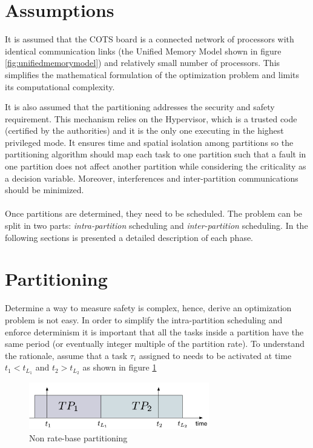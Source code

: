 \section{Assumptions}
It is assumed that the COTS board is a connected network of processors with identical communication links (the Unified Memory Model shown in figure \ref{fig:unifiedmemorymodel}) and relatively small number of processors. This simplifies the mathematical formulation of the optimization problem and limits its computational complexity.
\par It is also assumed that the partitioning addresses the security and safety requirement. This mechanism relies on the Hypervisor, which is a trusted code (certified by the authorities) and it is the only one executing in the highest privileged mode. It ensures time and spatial isolation among partitions so the partitioning algorithm should map each task to one partition such that a fault in one partition does not affect another partition while considering the criticality as a decision variable. Moreover, interferences and  inter-partition communications should be minimized.

\paragraph{} Once partitions are determined, they need to be scheduled. The problem can be split in two parts: \emph{intra-partition} scheduling and \emph{inter-partition} scheduling. In the following sections is presented a detailed description of each phase.

\section{Partitioning}
Determine a way to measure safety is complex, hence, derive an optimization problem is not easy. In order to simplify the intra-partition scheduling and enforce determinism it is important that all the tasks inside a partition have the same period (or eventually integer multiple of the partition rate). To understand the rationale, assume that a task $\tau_i$ assigned to  needs to be activated at time $t_1<t_{L_1}$ and $t_2>t_{L_2}$ as shown in figure \ref{fig:PartitionRationale}
\begin{figure}[htbp] 
\centering    
\includegraphics[width=0.7\textwidth]{PartitionRationale}
\caption{Non rate-base partitioning}
\label{fig:PartitionRationale}
\end{figure}

